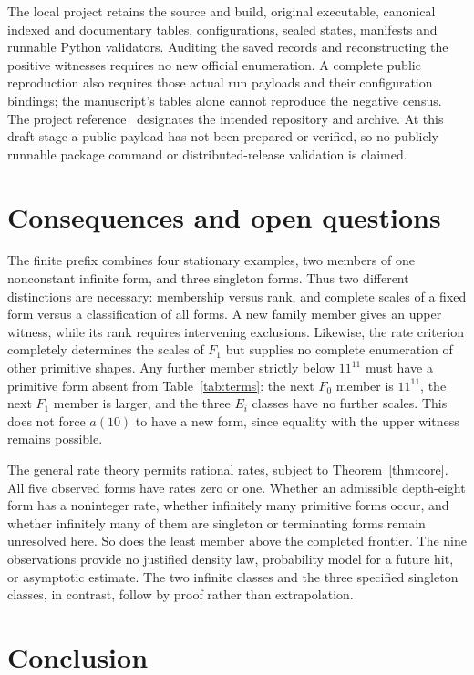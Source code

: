 \documentclass[11pt]{article}
\theoremstyle{definition}
\theoremstyle{remark}
\begin{document}
The local project retains the source and build, original executable,
canonical indexed and documentary tables, configurations, sealed
states, manifests and runnable Python validators. Auditing the
saved records and reconstructing the positive witnesses requires
no new official enumeration. A complete public reproduction also
requires those actual run payloads and their configuration bindings;
the manuscript's tables alone cannot reproduce the negative census.
The project reference~\cite{project} designates the intended
repository and archive. At this draft stage a public payload has
not been prepared or verified, so no publicly runnable package
command or distributed-release validation is claimed.

\section{Consequences and open questions}\label{sec:questions}

The finite prefix combines four stationary examples, two members
of one nonconstant infinite form, and three singleton forms.
Thus two different distinctions are necessary: membership versus
rank, and complete scales of a fixed form versus a classification
of all forms. A new family member gives an upper witness, while
its rank requires intervening exclusions. Likewise, the rate
criterion completely determines the scales of $F_1$ but supplies
no complete enumeration of other primitive shapes. Any further
member strictly below $11^{11}$ must have a primitive form absent
from Table~\ref{tab:terms}: the next $F_0$ member is $11^{11}$,
the next $F_1$ member is larger, and the three $E_i$ classes have
no further scales. This does not force $a(10)$ to have a new form,
since equality with the upper witness remains possible.

The general rate theory permits rational rates, subject to
Theorem~\ref{thm:core}. All five observed forms have rates zero
or one. Whether an admissible depth-eight form has a noninteger
rate, whether infinitely many primitive forms occur, and whether
infinitely many of them are singleton or terminating forms remain
unresolved here. So does the least member above the completed
frontier. The nine observations provide no justified density law,
probability model for a future hit, or asymptotic estimate.
The two infinite classes and the three specified singleton classes,
in contrast, follow by proof rather than extrapolation.

\section{Conclusion}\label{sec:conclusion}
\end{document}
